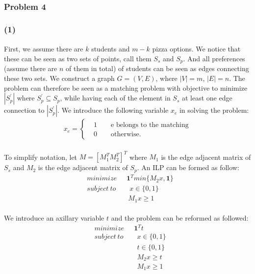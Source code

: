 \subsubsection*{Problem 4}
\subsubsection*{(1)}
\paragraph{}
First, we assume there are $k$ students and $m-k$ pizza options. We notice that these can be seen as two sets of points, call them $S_s$ and $S_p$. And all preferences (assume there are $n$ of them in total) of students can be seen as edges connecting these two sets. We construct a graph $G=(V,E)$, where $|V|=m$, $|E|=n$. The problem can therefore be seen as a matching problem with objective to minimize $|S_p^{\prime}|$ where $S_p^{\prime} \subseteq S_p$, while having each of the element in $S_s$ at least one edge connection to $|S_p^{\prime}|$. 
We introduce the following variable $x_e$ in solving the problem:
\begin{align*}
x_e = \begin{cases}
&1 \qquad \text{e belongs to the matching}\\
&0 \qquad \text{otherwise}.
\end{cases}
\end{align*}
\paragraph{}
To simplify notation, let $M = [M_1^T M_2^T]^T$ where $M_1$ is the edge adjacent matrix of $S_s$ and $M_2$ is the edge adjacent matrix of $S_p$. An ILP can be formed as follow:
\begin{align*}
& minimize \quad \ \  \textbf{1}^T min\{M_2 x, \textbf{1}\}\\
& subject \ to \qquad x\in \{0, 1\}\\
&\qquad \qquad \quad \quad M_1 x \geq 1
\end{align*}
\paragraph{}
We introduce an axillary variable $t$ and the problem can be reformed as followed:
\begin{align*}
& minimize \quad \ \  \textbf{1}^T t \\
& subject \ to \qquad x\in \{0, 1\}\\
&\qquad \qquad \quad \quad \ t \in \{0, 1\} \\
&\qquad \qquad \quad \quad \ M_2 x \geq t\\
&\qquad \qquad \quad \quad \ M_1 x \geq 1
\end{align*}
